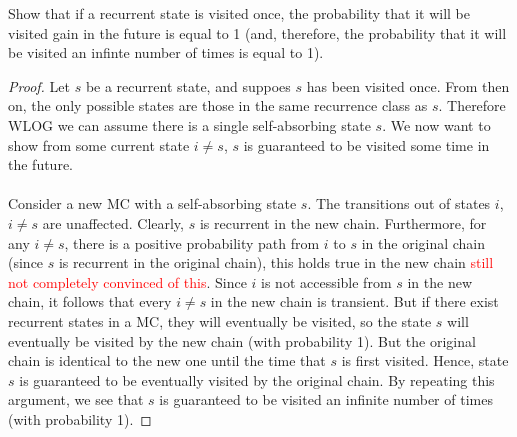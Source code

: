 \documentclass[11pt]{scrartcl}
\begin{document}
\begin{example}
  Show that if a recurrent state is visited once, the probability that it will
  be visited gain in the future is equal to 1 (and, therefore, the probability
  that it will be visited an infinte number of times is equal to 1).
  \begin{proof}
    Let $s$ be a recurrent state, and suppoes $s$ has been visited once. From
    then on, the only possible states are those in the same recurrence class as
    $s$. Therefore WLOG we can assume there is a single self-absorbing
    state $s$. We now want to show from some current state $i\neq s$,
    $s$ is guaranteed to be visited some time in the future.\\\\ Consider a new
    MC with a self-absorbing state $s$. The transitions out of states $i$,
    $i\neq s$ are unaffected. Clearly, $s$ is recurrent in the new chain.
    Furthermore, for any $i\neq s$, there is a positive probability path from
    $i$ to $s$ in the original chain (since $s$ is recurrent in the original
    chain), this holds true in the new chain \textcolor{red}{still not
    completely convinced of this}. Since $i$ is not accessible from $s$ in the
    new chain, it follows that  every $i\neq s$ in the new chain is transient.
    But if there exist recurrent states in a MC, they will eventually be
    visited, so the state $s$ will eventually be visited by the new chain (with
    probability 1). But the original chain is identical to the new one until
    the time that $s$ is first visited. Hence, state $s$ is guaranteed to be
    eventually visited by the original chain. By repeating this argument, we
    see that $s$ is guaranteed to be visited an infinite number of times (with
    probability 1).
  \end{proof}
\end{example}
\end{document}
